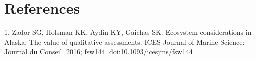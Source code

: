 \documentclass[10pt,]{article}
\begin{document}
\hypertarget{references}{%
\section*{References}\label{references}}

\hypertarget{refs}{}
\leavevmode\hypertarget{ref-zador_ecosystem_2016}{}%
1. Zador SG, Holsman KK, Aydin KY, Gaichas SK. Ecosystem considerations
in Alaska: The value of qualitative assessments. ICES Journal of Marine
Science: Journal du Conseil. 2016; fsw144.
doi:\href{https://doi.org/10.1093/icesjms/fsw144}{10.1093/icesjms/fsw144}
\end{document}
